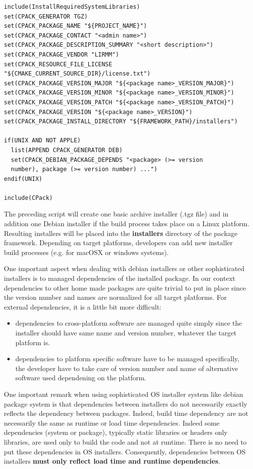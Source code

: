 \documentclass[12pt,a4paper]{article}
\begin{document}
\begin{verbatim}
include(InstallRequiredSystemLibraries)
set(CPACK_GENERATOR TGZ)
set(CPACK_PACKAGE_NAME "${PROJECT_NAME}")
set(CPACK_PACKAGE_CONTACT "<admin name>")
set(CPACK_PACKAGE_DESCRIPTION_SUMMARY "<short description>")
set(CPACK_PACKAGE_VENDOR "LIRMM")
set(CPACK_RESOURCE_FILE_LICENSE "${CMAKE_CURRENT_SOURCE_DIR}/license.txt")
set(CPACK_PACKAGE_VERSION_MAJOR "${<package name>_VERSION_MAJOR}")
set(CPACK_PACKAGE_VERSION_MINOR "${<package name>_VERSION_MINOR}")
set(CPACK_PACKAGE_VERSION_PATCH "${<package name>_VERSION_PATCH}")
set(CPACK_PACKAGE_VERSION "${<package name>_VERSION}")
set(CPACK_PACKAGE_INSTALL_DIRECTORY "${FRAMEWORK_PATH}/installers")

if(UNIX AND NOT APPLE)
  list(APPEND CPACK_GENERATOR DEB)  
  set(CPACK_DEBIAN_PACKAGE_DEPENDS "<package> (>= version 
  number), package (>= version number) ...")
endif(UNIX)

include(CPack)
\end{verbatim}

The preceding script will create one basic archive installer (.tgz file) and in addition one Debian installer if the build process takes place on a Linux platform. Resulting installers will be placed into the \textbf{installers} directory of the package framework. Depending on target platforms, developers can add new installer build processes (e.g. for macOSX or windows systems).

One important aspect when dealing with debian installers or other sophisticated installers is to managed dependencies of the installed package. In our context dependencies to other home made packages are quite trivial to put in place since the version number and names are normalized for all target platforms. For external dependencies, it is a little bit more difficult:
\begin{itemize}
\item dependencies to cross-platform software are managed quite simply since the installer should have same name and version number, whatever the target platform is.
\item dependencies to platform specific software have to be managed specifically, the developer have to take care of version number and name of alternative software used dependening on the platform.
\end{itemize}

One important remark when using sophisticated OS installer system like debian package system is that dependencies between installers do not necessarily exactly reflects the dependency between packages. Indeed, build time dependency are not necessarily the same as runtime or load time dependencies. Indeed some  dependencies (system or package), typically static libraries or headers only libraries, are used only to build the code and not at runtime. There is no need to put these dependencies in OS installers. Consequently,  dependencies between OS installers \textbf{must only reflect load time and runtime dependencies}. 
\end{document}
